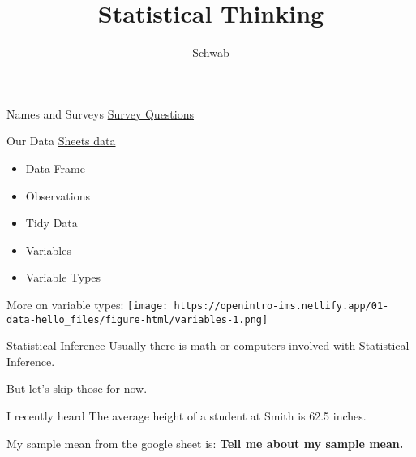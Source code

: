 \documentclass[
  ignorenonframetext,
]{beamer}
\title{Statistical Thinking}
\author{Schwab}
\date{}
\begin{document}
\frame{\titlepage}
\ifdefined\Shaded\renewenvironment{Shaded}{\begin{tcolorbox}[enhanced, boxrule=0pt, borderline west={3pt}{0pt}{shadecolor}, interior hidden, sharp corners, breakable, frame hidden]}{\end{tcolorbox}}\fi

\begin{frame}{Names and Surveys}
\protect\hypertarget{names-and-surveys}{}
\href{https://docs.google.com/forms/d/e/1FAIpQLSfYrVhaMo9BCVSTRZ8EhOnfxZbkdzjek9AB2EV11qFDDXgo9Q/viewform?usp=sf_link}{Survey
Questions}
\end{frame}

\begin{frame}{Our Data}
\protect\hypertarget{our-data}{}
\href{https://docs.google.com/spreadsheets/d/1x9srZXDoYzKGew1f-y4brMbN8dl4QM66pc-dmCBWHQY/edit?usp=sharing}{Sheets
data}

\begin{itemize}[<+->]
\item
  Data Frame
\item
  Observations
\item
  Tidy Data
\item
  Variables
\item
  Variable Types
\end{itemize}
\end{frame}

\begin{frame}{More on variable types:}
\protect\hypertarget{more-on-variable-types}{}
\texttt{[image: https://openintro-ims.netlify.app/01-data-hello\_files/figure-html/variables-1.png]}
\end{frame}

\begin{frame}{Statistical Inference}
\protect\hypertarget{statistical-inference}{}
Usually there is math or computers involved with Statistical Inference.

But let's skip those for now.
\end{frame}

\begin{frame}{I recently heard}
\protect\hypertarget{i-recently-heard}{}
The average height of a student at Smith is 62.5 inches.
\end{frame}

\begin{frame}{My sample mean from the google sheet is:}
\protect\hypertarget{my-sample-mean-from-the-google-sheet-is}{}
\textbf{Tell me about my sample mean.}
\end{frame}
\end{document}
